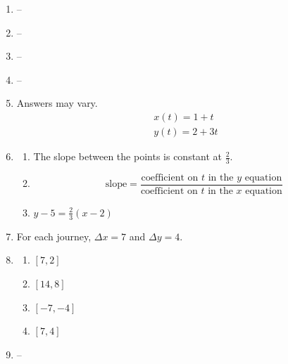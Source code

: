 \documentclass{article}
\begin{document}
\begin{enumerate}
\begin{enumerate}
	\item $(30, 22)$
	
	\item $(3 + 3t, 4 + 2t)$
	
	\end{enumerate}

\item  --

\item --

\item --

\item --

\item Answers may vary.
	 \begin{gather*}
	x(t) = 1 + t \\
	y(t) = 2 + 3t
	\end{gather*}
	
\item \begin{enumerate}

	\item The slope between the points is constant at $\frac{2}{3}$.
	
	\item \begin{equation*}
		\text{slope} = \frac{\text{coefficient on } t \text{ in the } y \text{ equation}}{\text{coefficient on } t \text{ in the } x \text{ equation}}
		\end{equation*}
		
	\item $y - 5 = \frac{2}{3}(x - 2)$

	\end{enumerate}
	
\item For each journey, $\Delta x = 7$ and $\Delta y = 4$.

\item \begin{enumerate}

	\item $[7, 2]$
	
	\item $[14, 8]$
	
	\item $[-7, -4]$
	
	\item $[7, 4]$
	
	\end{enumerate}
	
\item --


\end{enumerate}
\end{document}
